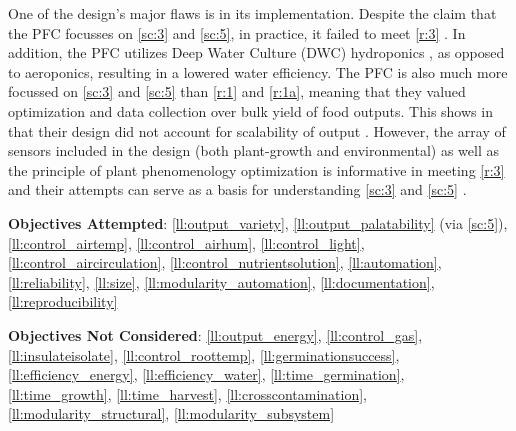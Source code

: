 \hspace{24pt} One of the design's major flaws is in its implementation. Despite the claim that the PFC focusses on \ref{sc:3} and \ref{sc:5}, in practice, it failed to meet \ref{r:3} \cite{mit-basil}.
In addition, the PFC utilizes Deep Water Culture (DWC) hydroponics \cite{mit-pfc}, as opposed to aeroponics, resulting in a lowered water efficiency.
The PFC is also much more focussed on \ref{sc:3} and \ref{sc:5} than \ref{r:1} and \ref{r:1a}, meaning that they valued optimization and data collection over bulk yield of food outputs. This shows in that their design did not account for scalability of output \cite{mit-wfp}.
However, the array of sensors included in the design (both plant-growth and environmental) as well as the principle of plant phenomenology optimization is informative in meeting \ref{r:3} and their attempts can serve as a basis for understanding \ref{sc:3} and \ref{sc:5} \cite{mit-openag}.

\textbf{Objectives Attempted}: \ref{ll:output_variety}, \ref{ll:output_palatability} (via \ref{sc:5}), \ref{ll:control_airtemp}, \ref{ll:control_airhum}, \ref{ll:control_light}, \ref{ll:control_aircirculation}, \ref{ll:control_nutrientsolution}, \ref{ll:automation}, \ref{ll:reliability}, \ref{ll:size}, \ref{ll:modularity_automation}, \ref{ll:documentation}, \ref{ll:reproducibility}

\textbf{Objectives Not Considered}: \ref{ll:output_energy}, \ref{ll:control_gas}, \ref{ll:insulateisolate}, \ref{ll:control_roottemp}, \ref{ll:germinationsuccess}, \ref{ll:efficiency_energy}, \ref{ll:efficiency_water}, \ref{ll:time_germination}, \ref{ll:time_growth}, \ref{ll:time_harvest}, \ref{ll:crosscontamination}, \ref{ll:modularity_structural}, \ref{ll:modularity_subsystem}
